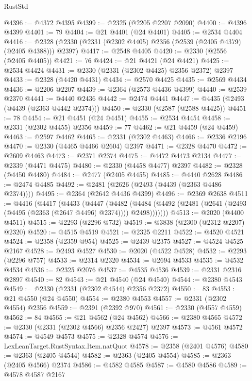 \begin{lexlean}{RustStd}
\begin{coremodule}
@4396 := @4372 @4395
@4399 := @2325 (@2205 @2207 @2090)
@4400 := @4396 @4399
@4401 := 79
@4404 := @21 @4401 (@24 @4401)
@4405 := @2534 @4404
@4416 := @2328 (@2330 (@2331 (@2302 @4405) @2356 (@2539 (@2405 @4379) (@2405 @4388))) @2397)
@4417 := @2548 @4405
@4420 := @2330 (@2556 (@2405 @4405))
@4421 := 76
@4424 := @21 @4421 (@24 @4421)
@4425 := @2534 @4424
@4431 := @2330 (@2331 (@2302 @4425) @2356 @2372) @2397
@4433 := @2328 (@4420 @4431)
@4434 := @2570 @4425
@4435 := @2569 @4434
@4436 := @2206 @2207
@4439 := @2364 (@2573 @4436 @4399)
@4440 := @2539 @2370
@4441 := @4440 @2436
@4442 := @2474 @4441
@4447 := @4435 (@2493 (@4439 (@2363 @4442 @2374)))
@4450 := @2330 (@2587 (@2588 @4425))
@4451 := 78
@4454 := @21 @4451 (@24 @4451)
@4455 := @2534 @4454
@4458 := @2331 (@2302 @4455) @2356
@4459 := 77
@4462 := @21 @4459 (@24 @4459)
@4463 := @2597 @4462
@4465 := @2331 (@2302 @4463)
@4466 := @2336 @2196
@4470 := @2330 (@4465 @4466 @2604) @2397
@4471 := @2328 @4470
@4472 := @2609 @4463
@4473 := @2371 @2374
@4475 := @4472 @4473 @2134
@4477 := @2339 (@4471 @4475)
@4480 := @2330 (@4458 @4477) @2397
@4482 := @2328 (@4450 @4480)
@4484 := @2477 (@2405 @4455)
@4485 := @4440 @2628
@4486 := @2474 @4485
@4492 := @2481 (@2626 (@2493 (@4439 (@2363 @4486 @2374))))
@4495 := @2364 (@2642 @4436 @4399)
@4496 := @2369 @2638
@4511 := @4416
    (@4417
      (@4433
        (@4447
          (@4482
            (@4484 (@4492 (@2481 (@2641 (@2493 (@4495 (@2363 (@2647 @4496) @2374)))) @2498)))))))
@4513 := @2020 (@4400 @4511)
@4515 := @2293 (@2296 @732)
@4519 := @3838 (@2300 (@2312 @2207) @2320)
@4520 := @4515 @4519
@4521 := @2325 @2211
@4522 := @4520 @4521
@4524 := @2358 (@2359 @954)
@4525 := @2439 @2375
@4527 := @4524 @4525 @2167
@4528 := @2493 @4527
@4530 := @2020 (@4522 @4528)
@4532 := @2293 (@2296 @757)
@4533 := @2314 @2320
@4534 := @2694 @4533
@4535 := @4532 @4534
@4536 := @2325 @2076
@4537 := @4535 @4536
@4539 := @2331 @2316 @2897
@4540 := 82
@4543 := @21 @4540 (@24 @4540)
@4544 := @2380 @4543
@4549 := @2330 (@2331 (@2302 @4544) @2356 @2372)
@4550 := 83
@4553 := @21 @4550 (@24 @4550)
@4554 := @2380 @4553
@4557 := @2331 (@2302 @4554) @2356
@4559 := @2391 (@2392 @970)
@4561 := @2330 (@4557 @4559)
@4562 := 84
@4565 := @21 @4562 (@24 @4562)
@4566 := @2380 @4565
@4572 := @2330 (@2331 (@2302 @4566) @2356 @2427) @2397
@4573 := @4561 @4572
@4574 := @4549 @4573
@4575 := @2328 @4574
@4576 := LexLeanTarget.RustSyntax.Item.natQuot
@4578 := @2358 (@2401 @4576)
@4580 := @2363 (@2405 @4544)
@4582 := @2363 (@2405 @4554)
@4585 := @2363 (@2405 @4566) @2374
@4586 := @4582 @4585
@4587 := @4580 @4586
@4589 := @4578 @4587 @2167

\end{coremodule}
\end{lexlean}
